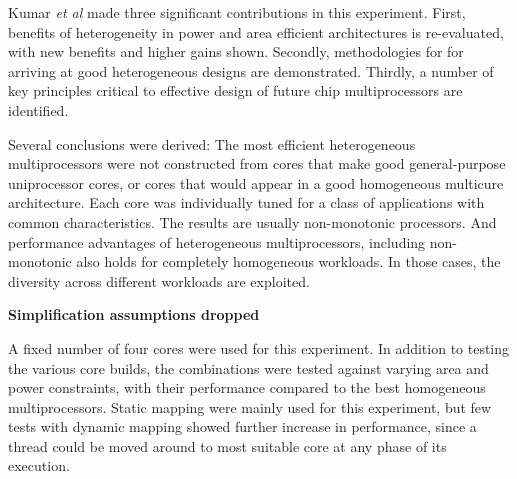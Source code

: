 Kumar \textit{et al} made three significant contributions in this experiment. 
First, benefits of heterogeneity in power and area efficient architectures is re-evaluated, with new benefits and higher gains shown.
Secondly, methodologies for for arriving at good heterogeneous designs are demonstrated.
Thirdly, a number of key principles critical to effective design of future chip multiprocessors are identified.

Several conclusions were derived:
The most efficient heterogeneous multiprocessors were not constructed from cores that make good general-purpose uniprocessor cores, or cores that would appear in a good homogeneous multicure architecture.
Each core was individually tuned for a class of applications with common characteristics.
The results are usually non-monotonic processors.
And performance advantages of heterogeneous multiprocessors, including non-monotonic also holds for completely homogeneous workloads.
In those cases, the diversity across different workloads are exploited.

\textbf{Simplification assumptions dropped}


A fixed number of four cores were used for this experiment.
In addition to testing the various core builds, the combinations were tested against varying area and power constraints, with their performance compared to the best homogeneous multiprocessors.
Static mapping were mainly used for this experiment, but few tests with dynamic mapping showed further increase in performance, since a thread could be moved around to most suitable core at any phase of its execution. 


